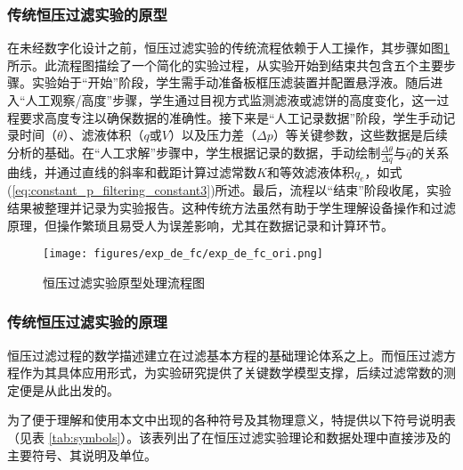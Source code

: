 \subsubsection{传统恒压过滤实验的原型}

在未经数字化设计之前，恒压过滤实验的传统流程依赖于人工操作，其步骤如图\ref{fig:exp_de_fc_ori}所示。此流程图描绘了一个简化的实验过程，从实验开始到结束共包含五个主要步骤。实验始于“开始”阶段，学生需手动准备板框压滤装置并配置悬浮液。随后进入“人工观察/高度”步骤，学生通过目视方式监测滤液或滤饼的高度变化，这一过程要求高度专注以确保数据的准确性。接下来是“人工记录数据”阶段，学生手动记录时间（\(\theta\)）、滤液体积（\(q\)或\(V\)）以及压力差（\(\Delta p\)）等关键参数，这些数据是后续分析的基础。在“人工求解”步骤中，学生根据记录的数据，手动绘制\(\frac{\Delta \theta}{\Delta q}\)与\(\bar{q}\)的关系曲线，并通过直线的斜率和截距计算过滤常数\(K\)和等效滤液体积\(q_e\)，如式(\ref{eq:constant_p_filtering_constant3})所述。最后，流程以“结束”阶段收尾，实验结果被整理并记录为实验报告。这种传统方法虽然有助于学生理解设备操作和过滤原理，但操作繁琐且易受人为误差影响，尤其在数据记录和计算环节。

\begin{figure}[H]
    \centering
    \texttt{[image: figures/exp\_de\_fc/exp\_de\_fc\_ori.png]}
    \caption{恒压过滤实验原型处理流程图}
    \label{fig:exp_de_fc_ori}
\end{figure}

\subsubsection{传统恒压过滤实验的原理}


恒压过滤过程的数学描述建立在过滤基本方程的基础理论体系之上。而恒压过滤方程作为其具体应用形式，为实验研究提供了关键数学模型支撑，后续过滤常数的测定便是从此出发的。

为了便于理解和使用本文中出现的各种符号及其物理意义，特提供以下符号说明表（见表 \ref{tab:symbols}）。该表列出了在恒压过滤实验理论和数据处理中直接涉及的主要符号、其说明及单位。

